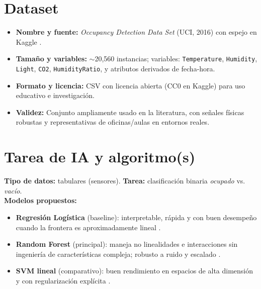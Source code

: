\documentclass[11pt,letterpaper]{article}
\begin{document}
\section*{Dataset}
\begin{itemize}[leftmargin=1.2em,itemsep=0.15em]
    \item \textbf{Nombre y fuente:} \textit{Occupancy Detection Data Set} (UCI, 2016) con espejo en Kaggle \cite{uci,kagglecc0,candanedo2016}.
    \item \textbf{Tamaño y variables:} $\sim$20{,}560 instancias; variables: \texttt{Temperature}, \texttt{Humidity}, \texttt{Light}, \texttt{CO2}, \texttt{HumidityRatio}, y atributos derivados de fecha-hora.
    \item \textbf{Formato y licencia:} CSV con licencia abierta (CC0 en Kaggle) para uso educativo e investigación.
    \item \textbf{Validez:} Conjunto ampliamente usado en la literatura, con señales físicas robustas y representativas de oficinas/aulas en entornos reales.
\end{itemize}

\section*{Tarea de IA y algoritmo(s)}
\textbf{Tipo de datos:} tabulares (sensores). \textbf{Tarea:} clasificación binaria \emph{ocupado} vs. \emph{vacío}.\\
\textbf{Modelos propuestos:}
\begin{itemize}[leftmargin=1.2em,itemsep=0.2em]
    \item \textbf{Regresión Logística} (baseline): interpretable, rápida y con buen desempeño cuando la frontera es aproximadamente lineal \cite{pedregosa2011,kohavi1995}.
    \item \textbf{Random Forest} (principal): maneja no linealidades e interacciones sin ingeniería de características compleja; robusto a ruido y escalado \cite{breiman2001}.
    \item \textbf{SVM lineal} (comparativo): buen rendimiento en espacios de alta dimensión y con regularización explícita \cite{cortesvapnik1995}.
\end{itemize}
\end{document}
